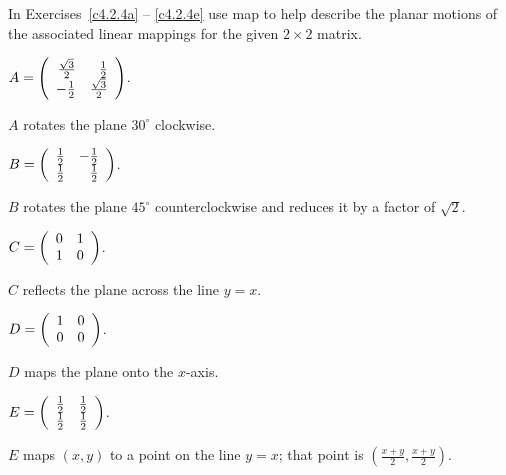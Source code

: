 \documentclass{ximera}
\begin{document}
\noindent In Exercises~\ref{c4.2.4a} -- \ref{c4.2.4e} use {\sf map} to
help describe the planar motions of the associated linear mappings for the
given $2\times 2$ matrix.
\begin{exercise} \label{c4.2.4a}
$A=\left(\begin{array}{rr} \frac{\sqrt{3}}{2} & \frac{1}{2}\\ -\frac{1}{2} &\frac{\sqrt{3}}{2}\end{array}\right)$.

\begin{solution}
$A$ rotates the plane $30^\circ$ clockwise.

\end{solution}
\end{exercise}
\begin{exercise} \label{c4.2.4b}
$B = \left(\begin{array}{rr} \frac{1}{2} & -\frac{1}{2}\\ \frac{1}{2} &\frac{1}{2}\end{array}\right)$.

\begin{solution}
$B$ rotates the plane $45^\circ$ counterclockwise and
reduces it by a factor of $\sqrt{2}$.

\end{solution}
\end{exercise}
\begin{exercise} \label{c4.2.4c}
$C = \left(\begin{array}{rr} 0 & 1\\ 1 &0\end{array}\right)$.

\begin{solution}
$C$ reflects the plane across the line $y = x$.

\end{solution}
\end{exercise}
\begin{exercise} \label{c4.2.4d}
$D = \left(\begin{array}{rr} 1 & 0\\ 0 &0\end{array}\right)$.

\begin{solution}
$D$ maps the plane onto the $x$-axis.

\end{solution}
\end{exercise}
\begin{exercise} \label{c4.2.4e}
$E = \left(\begin{array}{rr} \frac{1}{2} & \frac{1}{2}\\ \frac{1}{2} &\frac{1}{2}\end{array}\right)$.

\begin{solution}
$E$ maps $(x,y)$ to a point on the line $y = x$; that
point is $(\frac{x + y}{2}, \frac{x + y}{2})$.


\end{solution}
\end{exercise}
\end{document}
